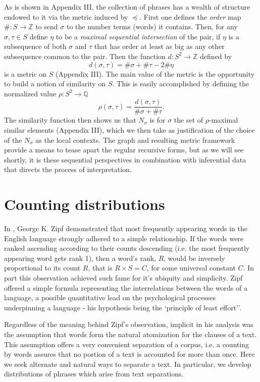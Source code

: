 As is shown in Appendix III, the collection of phrases has a wealth of
structure endowed to it via the metric induced by $\preceq$. First one
defines the \emph{order} map $\#: S\rightarrow\mathbb{Z}$ to send
$\sigma$ to the number terms (words) it contains. Then, for any
$\sigma,\tau\in S$ define $\eta$ to be a \emph{maximal sequential
intersection} of the pair, if $\eta$ is a subsequence of both $\sigma$
and $\tau$ that has order at least as big as any other subsequence
common to the pair. Then the function $d:S^2\rightarrow\mathbb{Z}$
defined by
$$d(\sigma,\tau)=\#\sigma+\#\tau-2\#\eta$$
is a metric on $S$ (Appendix III). The main value of the metric is the
opportunity to build a notion of similarity on $S$. This is easily
accomplished by defining the normalized value
$\rho:S^2\rightarrow\mathbb{Q}$
$$\rho(\sigma,\tau)=\frac{d(\sigma,\tau)}{\#\sigma+\#\tau}.$$
The similarity function then shows us that $N_\sigma$ is for $\sigma$
the set of $\rho$-maximal similar elements (Appendix III), which we
then take as justification of the choice of the $N_\sigma$ as the
local contexts. The graph and resulting metric framework provide a
means to tease apart the regular recursive forms, but as we will see
shortly, it is these sequential perspectives in combination with
inferential data that directs the process of interpretation.

\section{Counting distributions}
In \cite{Zipf01}, George K. Zipf demonstrated that most frequently
appearing words in the English language strongly adhered to a simple
relationship. If the words were ranked ascending according to their
counts descending (i.e. the most frequently appearing word gets rank
1), then a word's rank, $R$, would be inversely proportional to its
count $R$, that is $R\times S= C$, for some universal constant $C$. In
part this observation achieved such fame for it's ubiquity and
simplicity. Zipf offered a simple formula representing the
interrelations between the words of a language, a possible
quantitative lead on the psychological processes underpinning a
language - his hypothesis being the `principle of least
effort''\cite{Zipf04}.

Regardless of the meaning behind Zipf's observation, implicit in his
analysis was the assumption that words form the natural atomization
for the clauses of a text. This assumption offers a very convenient
separation of a corpus, i.e. a counting by words assures that no
portion of a text is accounted for more than once. Here we seek
alternate and natural ways to separate a text.  In particular, we
develop distributions of phrases which arise from text separations.

